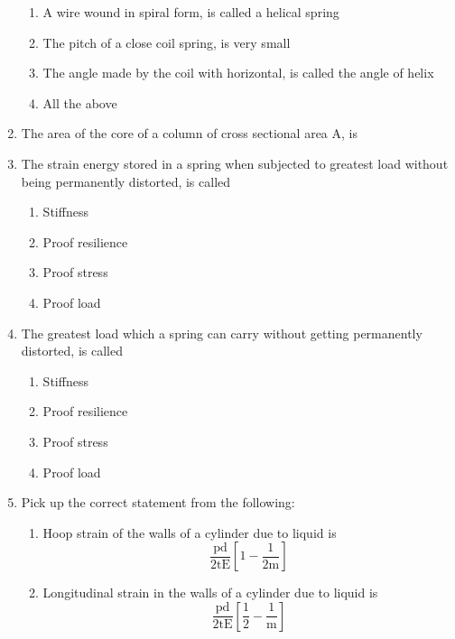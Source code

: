 \documentclass[11pt,a4paper]{article}
\begin{document}
\begin{enumerate}
\begin{enumerate}[label=\Alph*.]
\item{A wire wound in spiral form, is called a helical spring}
\item{The pitch of a close coil spring, is very small}
\item{The angle made by the coil with horizontal, is called the angle of helix}
\item{All the above}
\end{enumerate}
\item{The area of the core of a column of cross sectional area A, is}
\\
\item{The strain energy stored in a spring when subjected to greatest load without being permanently distorted, is called}
\begin{enumerate}[label=\Alph*.]
\item{Stiffness}
\item{Proof resilience}
\item{Proof stress}
\item{Proof load}
\end{enumerate}
\item{The greatest load which a spring can carry without getting permanently distorted, is called}
\begin{enumerate}[label=\Alph*.]
\item{Stiffness}
\item{Proof resilience}
\item{Proof stress}
\item{Proof load}
\end{enumerate}
\item{Pick up the correct statement from the following:}
\begin{enumerate}[label=\Alph*.]
\item{Hoop strain of the walls of a cylinder due to liquid is $$\frac{{{\text{pd}}}}{{2{\text{tE}}}}\left[ {1 - \frac{1}{{2{\text{m}}}}} \right]$$}
\item{Longitudinal strain in the walls of a cylinder due to liquid is $$\frac{{{\text{pd}}}}{{2{\text{tE}}}}\left[ {\frac{1}{2} - \frac{1}{{\text{m}}}} \right]$$}

\end{enumerate}
\end{enumerate}
\end{document}
